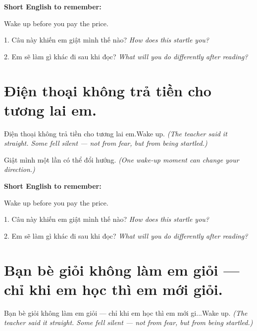 \begin{ghinhoanh}
\textbf{Short English to remember:}

Wake up before you pay the price.

\end{ghinhoanh}

\begin{tuhocnhanh}
1. Câu này khiến em giật mình thế nào? \textit{How does this startle you?}

2. Em sẽ làm gì khác đi sau khi đọc? \textit{What will you do differently after reading?}
\end{tuhocnhanh}
\ngancach


\section{Điện thoại không trả tiền cho tương lai em.}
\begin{truyen}{Điện thoại không trả tiền cho tương lai em.}{Wake up.}
\textit{(The teacher said it straight. Some fell silent — not from fear, but from being startled.)}
\end{truyen}

\begin{baihoc}
Giật mình một lần có thể đổi hướng.
\textit{(One wake-up moment can change your direction.)}
\end{baihoc}

\begin{ghinhoanh}
\textbf{Short English to remember:}

Wake up before you pay the price.

\end{ghinhoanh}

\begin{tuhocnhanh}
1. Câu này khiến em giật mình thế nào? \textit{How does this startle you?}

2. Em sẽ làm gì khác đi sau khi đọc? \textit{What will you do differently after reading?}
\end{tuhocnhanh}
\ngancach


\section{Bạn bè giỏi không làm em giỏi — chỉ khi em học thì em mới giỏi.}
\begin{truyen}{Bạn bè giỏi không làm em giỏi — chỉ khi em học thì em mới gi...}{Wake up.}
\textit{(The teacher said it straight. Some fell silent — not from fear, but from being startled.)}
\end{truyen}

